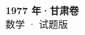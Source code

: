 \documentclass[zihao=-4, a4paper]{ctexart}
\begin{document}
\begin{center}
  {\Large\bfseries 1977 年·甘肃卷}\\[4pt]
  {\large 数学 · 试题版}
\end{center}
\medskip
{}

\end{document}
